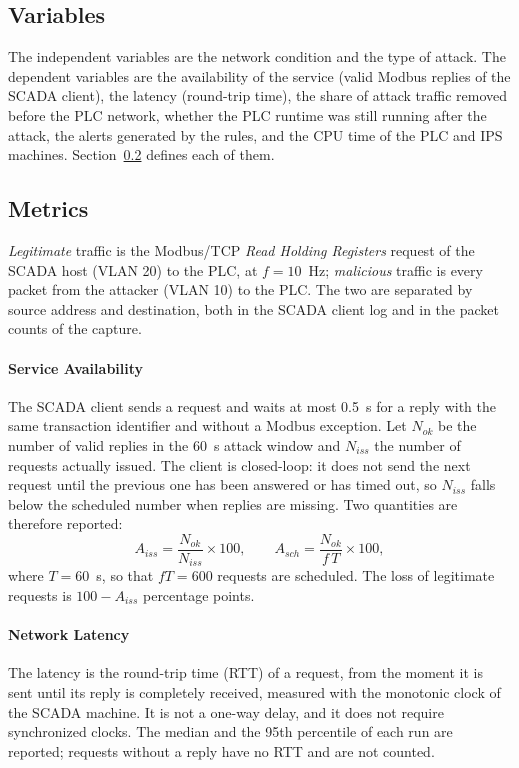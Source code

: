 \subsection{Variables}
The independent variables are the network condition and the type of attack. The dependent variables are the availability of the service (valid Modbus replies of the SCADA client), the latency (round-trip time), the share of attack traffic removed before the PLC network, whether the PLC runtime was still running after the attack, the alerts generated by the rules, and the CPU time of the PLC and IPS machines. Section~\ref{sec:metrics} defines each of them.

\subsection{Metrics}\label{sec:metrics}
\emph{Legitimate} traffic is the Modbus/TCP \emph{Read Holding Registers} request of the SCADA host (VLAN 20) to the PLC, at $f=10$~Hz; \emph{malicious} traffic is every packet from the attacker (VLAN 10) to the PLC. The two are separated by source address and destination, both in the SCADA client log and in the packet counts of the capture.

\paragraph{Service Availability}
The SCADA client sends a request and waits at most 0.5~s for a reply with the same transaction identifier and without a Modbus exception. Let $N_{ok}$ be the number of valid replies in the 60~s attack window and $N_{iss}$ the number of requests actually issued. The client is closed-loop: it does not send the next request until the previous one has been answered or has timed out, so $N_{iss}$ falls below the scheduled number when replies are missing. Two quantities are therefore reported:
\begin{equation}
A_{iss}=\frac{N_{ok}}{N_{iss}}\times 100,\qquad A_{sch}=\frac{N_{ok}}{f\,T}\times 100,
\end{equation}
where $T=60$~s, so that $fT=600$ requests are scheduled. The loss of legitimate requests is $100-A_{iss}$ percentage points.

\paragraph{Network Latency}
The latency is the round-trip time (RTT) of a request, from the moment it is sent until its reply is completely received, measured with the monotonic clock of the SCADA machine. It is not a one-way delay, and it does not require synchronized clocks. The median and the 95th percentile of each run are reported; requests without a reply have no RTT and are not counted.

